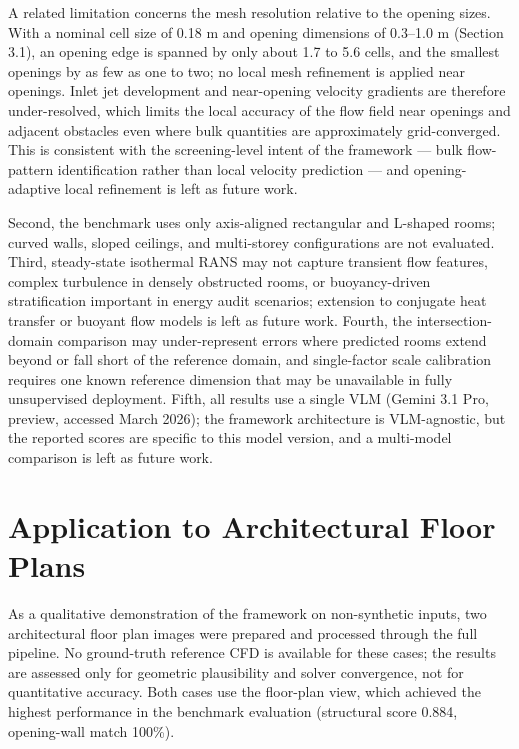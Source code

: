 \documentclass[preprint,12pt,number]{elsarticle}
\begin{document}
A related limitation concerns the mesh resolution relative to the opening sizes. With a nominal cell size of 0.18 m and opening dimensions of 0.3--1.0 m (Section 3.1), an opening edge is spanned by only about 1.7 to 5.6 cells, and the smallest openings by as few as one to two; no local mesh refinement is applied near openings. Inlet jet development and near-opening velocity gradients are therefore under-resolved, which limits the local accuracy of the flow field near openings and adjacent obstacles even where bulk quantities are approximately grid-converged. This is consistent with the screening-level intent of the framework --- bulk flow-pattern identification rather than local velocity prediction --- and opening-adaptive local refinement is left as future work.

Second, the benchmark uses only axis-aligned rectangular and L-shaped rooms; curved walls, sloped ceilings, and multi-storey configurations are not evaluated. Third, steady-state isothermal RANS may not capture transient flow features, complex turbulence in densely obstructed rooms, or buoyancy-driven stratification important in energy audit scenarios; extension to conjugate heat transfer or buoyant flow models is left as future work. Fourth, the intersection-domain comparison may under-represent errors where predicted rooms extend beyond or fall short of the reference domain, and single-factor scale calibration requires one known reference dimension that may be unavailable in fully unsupervised deployment. Fifth, all results use a single VLM (Gemini 3.1 Pro, preview, accessed March 2026); the framework architecture is VLM-agnostic, but the reported scores are specific to this model version, and a multi-model comparison is left as future work.


\section{Application to Architectural Floor Plans}
\label{sec:application-to-architectural-floor-plans}


As a qualitative demonstration of the framework on non-synthetic inputs, two architectural floor plan images were prepared and processed through the full pipeline. No ground-truth reference CFD is available for these cases; the results are assessed only for geometric plausibility and solver convergence, not for quantitative accuracy. Both cases use the floor-plan view, which achieved the highest performance in the benchmark evaluation (structural score 0.884, opening-wall match 100\%).
\end{document}
